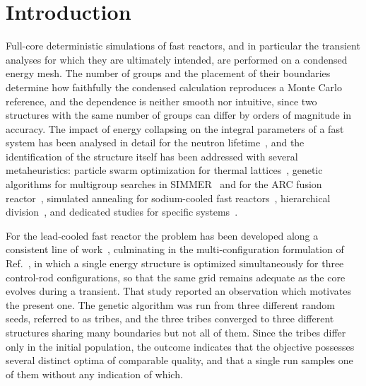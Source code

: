 \documentclass{style/nseJournal}
\begin{document}
\section{Introduction}

Full-core deterministic simulations of fast reactors, and in particular the
transient analyses for which they are ultimately intended, are performed on a
condensed energy mesh. The number of groups and the placement of their
boundaries determine how faithfully the condensed calculation reproduces a
Monte Carlo reference, and the dependence is neither smooth nor intuitive, since
two structures with the same number of groups can differ by orders of magnitude
in accuracy. The impact of energy collapsing on the integral parameters of a
fast system has been analysed in detail for the neutron
lifetime~\cite{collapsing}, and the identification of the structure itself has
been addressed with several metaheuristics: particle swarm optimization for
thermal lattices~\cite{psoThermal}, genetic algorithms for multigroup searches
in SIMMER~\cite{massoneGA,simmerGA} and for the ARC fusion
reactor~\cite{arcGA}, simulated annealing for sodium-cooled fast
reactors~\cite{sfrSA}, hierarchical division~\cite{hierDiv}, and dedicated
studies for specific systems~\cite{scwr}.

For the lead-cooled fast reactor the problem has been developed along a
consistent line of work~\cite{lfrGA2022,lfrGA2024,prevGA}, culminating in the
multi-configuration formulation of Ref.~\cite{prevMulti}, in which a single
energy structure is optimized simultaneously for three control-rod
configurations, so that the same grid remains adequate as the core evolves
during a transient. That study reported an observation which motivates the
present one. The genetic algorithm was run from three different random seeds,
referred to as tribes, and the three tribes converged to three different
structures sharing many boundaries but not all of them. Since the tribes differ
only in the initial population, the outcome indicates that the objective
possesses several distinct optima of comparable quality, and that a single run
samples one of them without any indication of which.
\end{document}

